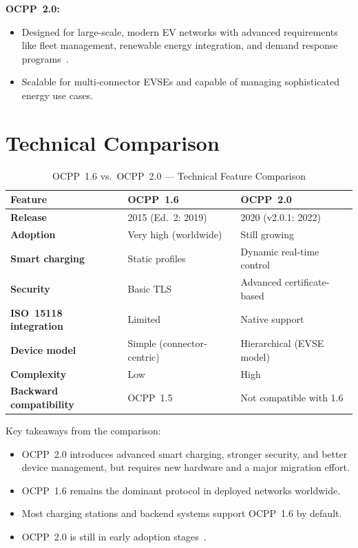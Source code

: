 \documentclass[12pt,a4paper]{report}
\begin{document}
\textbf{OCPP~2.0:}
\begin{itemize}
  \item Designed for large-scale, modern EV networks with advanced requirements like fleet
        management, renewable energy integration, and demand response programs~\autocite{ampcontrol2024}.
  \item Scalable for multi-connector EVSEs and capable of managing sophisticated energy use
        cases.
\end{itemize}

\section{Technical Comparison}

\begin{table}[h!]
  \centering
  \caption{OCPP~1.6 vs.\ OCPP~2.0 --- Technical Feature Comparison}
  \label{tab:ocpp-comparison}
  \renewcommand{\arraystretch}{1.35}
  \begin{tabular}{>{\bfseries}p{5cm} p{4.5cm} p{4.5cm}}
    \toprule
    Feature                   & OCPP~1.6~\autocite{ocpp16_ed2}  & OCPP~2.0~\autocite{ocpp201} \\
    \midrule
    Release                   & 2015 (Ed.~2: 2019)          & 2020 (v2.0.1: 2022) \\
    Adoption                  & Very high (worldwide)       & Still growing \\
    Smart charging            & Static profiles             & Dynamic real-time control \\
    Security                  & Basic TLS                   & Advanced certificate-based \\
    ISO~15118 integration     & Limited                     & Native support \\
    Device model              & Simple (connector-centric)  & Hierarchical (EVSE model) \\
    Complexity                & Low                         & High \\
    Backward compatibility    & OCPP~1.5                    & Not compatible with 1.6 \\
    \bottomrule
  \end{tabular}
\end{table}

Key takeaways from the comparison:
\begin{itemize}
  \item OCPP~2.0 introduces advanced smart charging, stronger security, and better device
        management, but requires new hardware and a major migration effort.
  \item OCPP~1.6 remains the dominant protocol in deployed networks worldwide.
  \item Most charging stations and backend systems support OCPP~1.6 by default.
  \item OCPP~2.0 is still in early adoption stages~\autocite{iea_ev_outlook_2024}.
\end{itemize}
\end{document}
